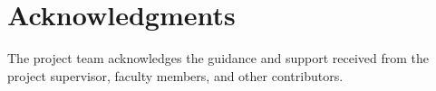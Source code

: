 \chapter*{Acknowledgments}
The project team acknowledges the guidance and support received from the project supervisor, faculty members, and other contributors.
